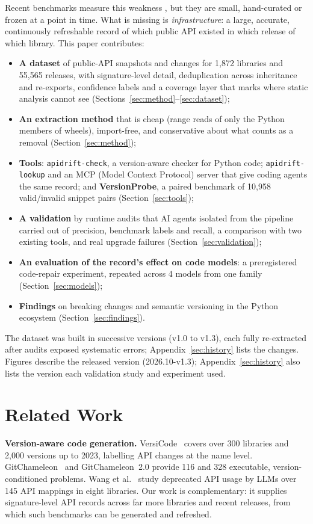 \documentclass[10pt,twocolumn,letterpaper]{article}
\begin{document}
Recent benchmarks measure this weakness \cite{versicode,gitchameleon,gitchameleon2,wang2024deprecated}, but they
are small, hand-curated or frozen at a point in time. What is missing is \emph{infrastructure}: a large, accurate,
continuously refreshable record of which public API existed in which release of which library. This paper
contributes:
\begin{itemize}\setlength\itemsep{0pt}
\item \textbf{A dataset} of public-API snapshots and changes for 1,872 libraries and 55,565 releases,
with signature-level detail, deduplication across inheritance and re-exports, confidence labels and a coverage layer
that marks where static analysis cannot see (Sections~\ref{sec:method}--\ref{sec:dataset});
\item \textbf{An extraction method} that is cheap (range reads of only the Python members of wheels), import-free,
and conservative about what counts as a removal (Section~\ref{sec:method});
\item \textbf{Tools}: \texttt{apidrift-check}, a version-aware checker for Python code; \texttt{apidrift-lookup} and an
MCP (Model Context Protocol) server that give coding agents the same record; and \textbf{VersionProbe}, a paired benchmark of 10,958
valid/invalid snippet pairs (Section~\ref{sec:tools});
\item \textbf{A validation} by runtime audits that AI agents isolated from the pipeline carried out of precision, benchmark labels and recall, a comparison
with two existing tools, and real upgrade failures (Section~\ref{sec:validation});
\item \textbf{An evaluation of the record's effect on code models}: a preregistered code-repair experiment, repeated across
4 models from one family (Section~\ref{sec:models});
\item \textbf{Findings} on breaking changes and semantic versioning in the Python ecosystem (Section~\ref{sec:findings}).
\end{itemize}
The dataset was built in successive versions (v1.0 to v1.3), each fully re-extracted after audits exposed
systematic errors; Appendix~\ref{sec:history} lists the changes. Figures describe the released version
(2026.10-v1.3); Appendix~\ref{sec:history} also lists the version each validation study and experiment
used.

\section{Related Work}
\textbf{Version-aware code generation.} VersiCode~\cite{versicode} covers over 300 libraries and 2,000 versions
up to 2023, labelling API changes at the name level. GitChameleon~\cite{gitchameleon} and GitChameleon~2.0
\cite{gitchameleon2} provide 116 and 328 executable, version-conditioned problems. Wang et
al.~\cite{wang2024deprecated} study deprecated API usage by LLMs over 145 API mappings in eight libraries. Our work
is complementary: it supplies signature-level API records across far more libraries and recent releases, from
which such benchmarks can be generated and refreshed.
\end{document}
